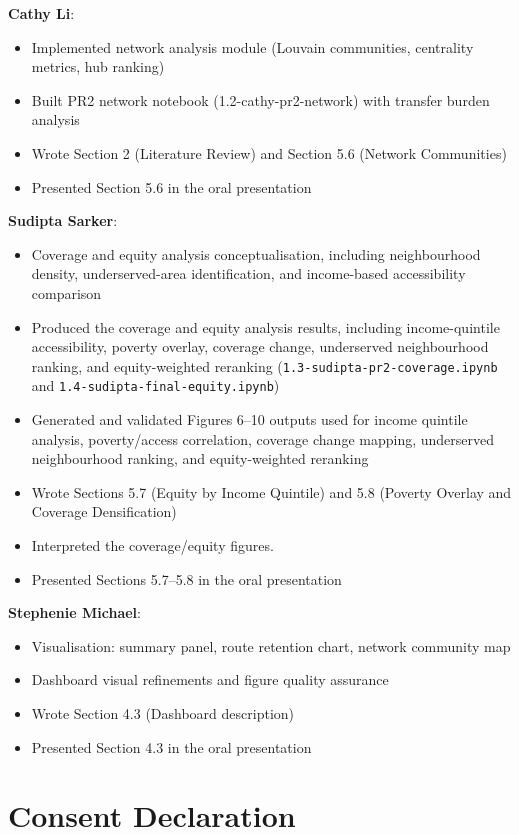 \documentclass[11pt]{article}
\begin{document}
\textbf{Cathy Li}:
\begin{itemize}[nosep]
\item Implemented network analysis module (Louvain communities, centrality metrics, hub ranking)
\item Built PR2 network notebook (1.2-cathy-pr2-network) with transfer burden analysis
\item Wrote Section 2 (Literature Review) and Section 5.6 (Network Communities)
\item Presented Section 5.6 in the oral presentation
\end{itemize}

\textbf{Sudipta Sarker}:
\begin{itemize}[nosep]
\item Coverage and equity analysis conceptualisation, including neighbourhood density, underserved-area identification, and income-based accessibility comparison
\item Produced the coverage and equity analysis results, including income-quintile accessibility, poverty overlay, coverage change, underserved neighbourhood ranking, and equity-weighted reranking (\texttt{1.3-sudipta-pr2-coverage.ipynb} and \texttt{1.4-sudipta-final-equity.ipynb})
\item Generated and validated Figures 6--10 outputs used for income quintile analysis, poverty/access correlation, coverage change mapping, underserved neighbourhood ranking, and equity-weighted reranking
\item Wrote Sections 5.7 (Equity by Income Quintile) and 5.8 (Poverty Overlay and Coverage Densification)
\item Interpreted the coverage/equity figures.
\item Presented Sections 5.7--5.8 in the oral presentation
\end{itemize}

\textbf{Stephenie Michael}:
\begin{itemize}[nosep]
\item Visualisation: summary panel, route retention chart, network community map
\item Dashboard visual refinements and figure quality assurance
\item Wrote Section 4.3 (Dashboard description)
\item Presented Section 4.3 in the oral presentation
\end{itemize}

\section{Consent Declaration}
\end{document}

